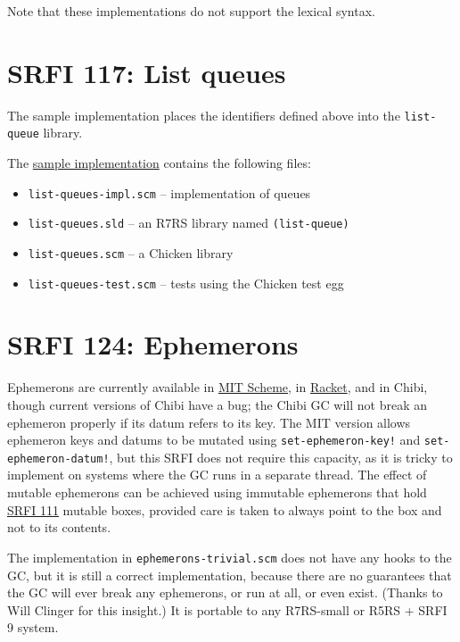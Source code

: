 Note that these implementations do not support the lexical syntax.

\section{SRFI 117: List queues}

The sample implementation places the identifiers defined above into the
\texttt{list-queue} library.

The \href{http://srfi.schemers.org/srfi-117/list-queues.tar.gz}{sample
implementation} contains the following files:

\begin{itemize}
\tightlist
\item
  \texttt{list-queues-impl.scm} -- implementation of queues
\item
  \texttt{list-queues.sld} -- an R7RS library named
  \texttt{(list-queue)}
\item
  \texttt{list-queues.scm} -- a Chicken library
\item
  \texttt{list-queues-test.scm} -- tests using the Chicken test egg
\end{itemize}

\section{SRFI 124: Ephemerons}

Ephemerons are currently available in
\href{http://www.gnu.org/software/mit-scheme/documentation/mit-scheme-ref/Ephemerons.html}{MIT
Scheme}, in
\href{http://docs.racket-lang.org/reference/ephemerons.html}{Racket},
and in Chibi, though current versions of Chibi have a bug; the Chibi GC
will not break an ephemeron properly if its datum refers to its key. The
MIT version allows ephemeron keys and datums to be mutated using
\texttt{set-ephemeron-key!} and \texttt{set-ephemeron-datum!}, but this
SRFI does not require this capacity, as it is tricky to implement on
systems where the GC runs in a separate thread. The effect of mutable
ephemerons can be achieved using immutable ephemerons that hold
\href{http://srfi.schemers.org/srfi-111/srfi-111.html}{SRFI 111} mutable
boxes, provided care is taken to always point to the box and not to its
contents.

The implementation in \texttt{ephemerons-trivial.scm} does not have any
hooks to the GC, but it is still a correct implementation, because there
are no guarantees that the GC will ever break any ephemerons, or run at
all, or even exist. (Thanks to Will Clinger for this insight.) It is
portable to any R7RS-small or R5RS + SRFI 9 system.

